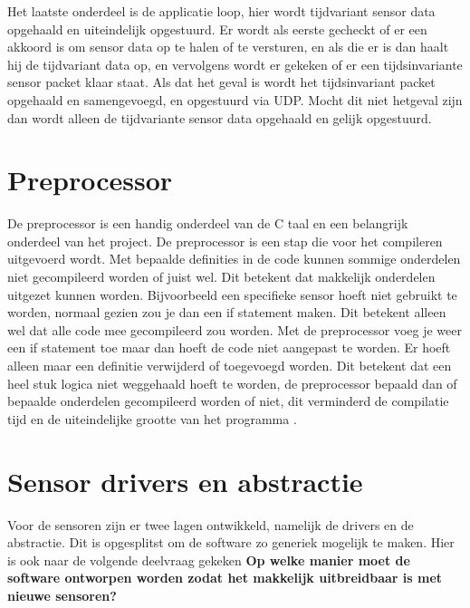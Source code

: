 \noindent Het laatste onderdeel is de applicatie loop, hier wordt tijdvariant sensor data opgehaald en uiteindelijk opgestuurd. Er wordt als eerste gecheckt of er een akkoord is om sensor data op te halen of te versturen, en als die er is dan haalt hij de tijdvariant data op, en vervolgens wordt er gekeken of er een tijdsinvariante sensor packet klaar staat. Als dat het geval is wordt het tijdsinvariant packet opgehaald en samengevoegd, en opgestuurd via UDP. Mocht dit niet hetgeval zijn dan wordt alleen de tijdvariante sensor data opgehaald en gelijk opgestuurd. \newline

\section{Preprocessor} \label{sec:preprocessor}
De preprocessor is een handig onderdeel van de C taal en een belangrijk onderdeel van het project. De preprocessor is een stap die voor het compileren uitgevoerd wordt. Met bepaalde definities in de code kunnen sommige onderdelen niet gecompileerd worden of juist wel. Dit betekent dat makkelijk onderdelen uitgezet kunnen worden. Bijvoorbeeld een specifieke sensor hoeft niet gebruikt te worden, normaal gezien zou je dan een if statement maken. Dit betekent alleen wel dat alle code mee gecompileerd zou worden. Met de preprocessor voeg je weer een if statement toe maar dan hoeft de code niet aangepast te worden. Er hoeft alleen maar een definitie verwijderd of toegevoegd worden. Dit betekent dat een heel stuk logica niet weggehaald hoeft te worden, de preprocessor bepaald dan of bepaalde onderdelen gecompileerd worden of niet, dit verminderd de compilatie tijd en de uiteindelijke grootte van het programma \autocite{preprocessor}. 

\section{Sensor drivers en abstractie}
Voor de sensoren zijn er twee lagen ontwikkeld, namelijk de drivers en de abstractie. Dit is opgesplitst om de software zo generiek mogelijk te maken. Hier is ook naar de volgende deelvraag gekeken \textbf{Op welke manier moet de software ontworpen worden zodat het makkelijk uitbreidbaar is met nieuwe sensoren?} \newline 

